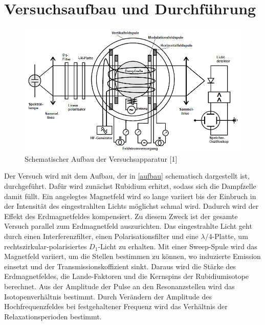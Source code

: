 \section{Versuchsaufbau und Durchführung}

\begin{figure}[h]
\centering
\includegraphics[width=\textwidth]{./optischesPumpen/img/aufbau.png}
\caption{Schematischer Aufbau der Versuchsapparatur [1]}
\label{aufbau}
\end{figure}

Der Versuch wird mit dem Aufbau, der in \autoref{aufbau} schematisch dargestellt ist, durchgeführt. Dafür wird
zunächst Rubidium erhitzt, sodass sich die Dampfzelle damit füllt. Ein angelegtes Magnetfeld wird so lange variiert
bis der Einbruch in der Intensität des eingestrahlten Lichts möglichst schmal wird. Dadurch wird der Effekt des
Erdmagnetfeldes kompensiert. Zu diesem Zweck ist der gesamte Versuch parallel zum Erdmagnetfeld auszurichten. Das
eingestrahlte Licht geht durch einen Interferenzfilter, einen Polarisationsfilter und eine $\lambda/4$-Platte, um
rechtszirkular-polarisiertes $D_1$-Licht zu erhalten. Mit einer Sweep-Spule wird das Magnetfeld variiert, um die
Stellen bestimmen zu können, wo induzierte Emission einsetzt und der Transmissionskoffizient sinkt. Daraus wird die
Stärke des Erdmagnetfeldes, die Lande-Faktoren und die Kernspins der Rubidiumisotope berechnet. Aus der Amplitude
der Pulse an den Resonanzstellen wird das Isotopenverhältnis bestimmt. Durch Verändern der Amplitude des
Hochfrequenzfeldes bei festgehaltener Frequenz wird das Verhältnis der Relaxationsperioden bestimmt.
